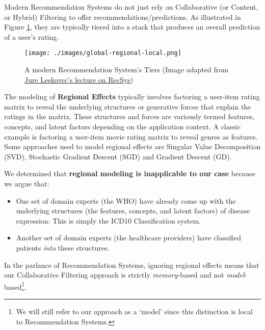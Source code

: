 \documentclass[twoside,11pt]{article}
\begin{document}
Modern Recommendation Systems do not just rely on Collaborative (or Content, or Hybrid) Filtering to offer recommendations/predictions. As illustrated in Figure \ref{fig:effects}, they are typically tiered into a stack that produces an overall prediction of a user's rating.

\begin{figure}[H]
	\centering
  \texttt{[image: ./images/global-regional-local.png]}
  \caption{A modern Recommendation System's Tiers (Image adapted from \href{http://snap.stanford.edu/class/cs246-2015/slides/08-recsys2.pdf}{Jure Leskovec's lecture on RecSys})}
  \label{fig:effects}
\end{figure}

The modeling of \textbf{Regional Effects} typically involves factoring a user-item rating matrix to reveal the underlying structures or generative forces that explain the ratings in the matrix. These structures and forces are variously termed features, concepts, and latent factors depending on the application context. A classic example is factoring a user-item movie rating matrix to reveal genres as features. Some approaches used to model regional effects are Singular Value Decomposition (SVD), Stochastic Gradient Descent (SGD) and Gradient Descent (GD).

We determined that \textbf{regional modeling is inapplicable to our case} because we argue that:
\begin{itemize}
  \item One set of domain experts (the WHO) have already come up with the underlying structures (the features, concepts, and latent factors) of disease expression: This is simply the ICD10 Classification system.
  \item Another set of domain experts (the healthcare providers) have classified patients \textit{into} these structures.
\end{itemize}

In the parlance of Recommendation Systems, ignoring regional effects means that our Collaborative Filtering approach is strictly \textit{memory}-based and not \textit{model}-based\footnote{We will still refer to our approach as a `model' since this distinction is local to Recommendation Systems.}.
\end{document}
